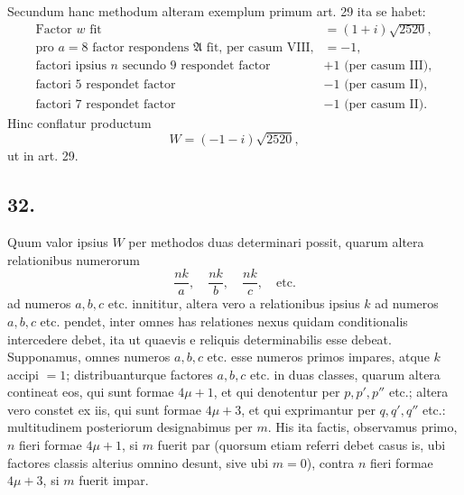 \documentclass[12pt]{article}
\begin{document}
Secundum hanc methodum alteram exemplum primum art. 29 ita se habet:
\[
\begin{array}{ll}
\text{Factor }w\text{ fit} & =(1+i)\sqrt{2520},\\
\text{pro }a=8\text{ factor respondens }\mathfrak A\text{ fit, per casum VIII,} & =-1,\\
\text{factori ipsius }n\text{ secundo }9\text{ respondet factor} & +1\text{ (per casum III)},\\
\text{factori }5\text{ respondet factor} & -1\text{ (per casum II)},\\
\text{factori }7\text{ respondet factor} & -1\text{ (per casum II)}.
\end{array}
\]
Hinc conflatur productum
\[
W=(-1-i)\sqrt{2520},
\]
ut in art. 29.

\subsection*{32.}

Quum valor ipsius $W$ per methodos duas determinari possit, quarum altera relationibus numerorum
\[
\frac{nk}{a},\quad \frac{nk}{b},\quad \frac{nk}{c},\quad\text{etc.}
\]
ad numeros $a,b,c$ etc. innititur, altera vero a relationibus ipsius $k$ ad numeros $a,b,c$ etc. pendet, inter omnes has relationes nexus quidam conditionalis intercedere debet, ita ut quaevis e reliquis determinabilis esse debeat. Supponamus, omnes numeros $a,b,c$ etc. esse numeros primos impares, atque $k$ accipi $=1$; distribuanturque factores $a,b,c$ etc. in duas classes, quarum altera contineat eos, qui sunt formae $4\mu+1$, et qui denotentur per $p,p',p''$ etc.; altera vero constet ex iis, qui sunt formae $4\mu+3$, et qui exprimantur per $q,q',q''$ etc.: multitudinem posteriorum designabimus per $m$. His ita factis, observamus primo, $n$ fieri formae $4\mu+1$, si $m$ fuerit par (quorsum etiam referri debet casus is, ubi factores classis alterius omnino desunt, sive ubi $m=0$), contra $n$ fieri formae $4\mu+3$, si $m$ fuerit impar.
\end{document}
